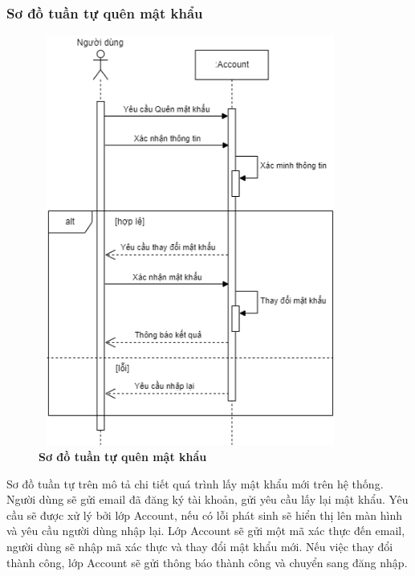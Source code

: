 \subsubsection{Sơ đồ tuần tự quên mật khẩu}
\begin{figure}[H]
  \centering
  \includegraphics[width=10cm,height=13.5cm]{Images/sequence/sequence_forgot_password.png}
  \caption[Sơ đồ tuần tự quên mật khẩu]{\bfseries \fontsize{12pt}{0pt}
  \selectfont Sơ đồ tuần tự quên mật khẩu}
  \label{sequence_forgot_pass} %
\end{figure}
Sơ đồ tuần tự trên mô tả chi tiết quá trình lấy mật khẩu mới trên hệ thống. Người dùng sẽ gửi email đã đăng ký tài khoản, gửi yêu cầu
lấy lại mật khẩu. Yêu cầu sẽ được xử lý bởi lớp Account, nếu có lỗi phát sinh sẽ hiển thị lên màn hình và yêu cầu người dùng nhập lại. Lớp Account sẽ gửi một mã xác thực
đến email, người dùng sẽ nhập mã xác thực và thay đổi mật khẩu mới. Nếu việc thay đổi thành công, lớp Account sẽ gửi thông báo thành công và chuyển sang đăng nhập.

